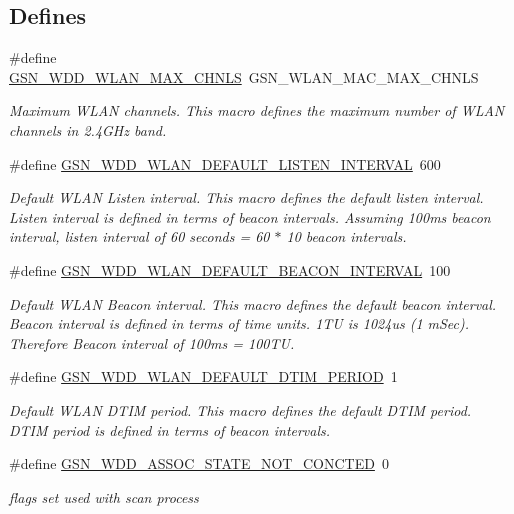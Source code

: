 \subsection*{Defines}
\begin{DoxyCompactItemize}
\item 
\#define \hyperlink{a00677_ga3d65e35c6d96f765b7e4c83373d90c57}{GSN\_\-WDD\_\-WLAN\_\-MAX\_\-CHNLS}~GSN\_\-WLAN\_\-MAC\_\-MAX\_\-CHNLS
\begin{DoxyCompactList}\small\item\em Maximum WLAN channels. This macro defines the maximum number of WLAN channels in 2.4GHz band. \end{DoxyCompactList}\item 
\#define \hyperlink{a00677_ga1cd4e2c2ef057685d974d4a865e5f934}{GSN\_\-WDD\_\-WLAN\_\-DEFAULT\_\-LISTEN\_\-INTERVAL}~600
\begin{DoxyCompactList}\small\item\em Default WLAN Listen interval. This macro defines the default listen interval. Listen interval is defined in terms of beacon intervals. Assuming 100ms beacon interval, listen interval of 60 seconds = 60 $\ast$ 10 beacon intervals. \end{DoxyCompactList}\item 
\#define \hyperlink{a00677_gab70cb03c6369e528aaa34311acfc1726}{GSN\_\-WDD\_\-WLAN\_\-DEFAULT\_\-BEACON\_\-INTERVAL}~100
\begin{DoxyCompactList}\small\item\em Default WLAN Beacon interval. This macro defines the default beacon interval. Beacon interval is defined in terms of time units. 1TU is 1024us (1 mSec). Therefore Beacon interval of 100ms = 100TU. \end{DoxyCompactList}\item 
\#define \hyperlink{a00677_ga406fd2f9962a7ec83167cd6bcafdd221}{GSN\_\-WDD\_\-WLAN\_\-DEFAULT\_\-DTIM\_\-PERIOD}~1
\begin{DoxyCompactList}\small\item\em Default WLAN DTIM period. This macro defines the default DTIM period. DTIM period is defined in terms of beacon intervals. \end{DoxyCompactList}\item 
\#define \hyperlink{a00677_ga5f07a309e776550d66ddc892d44295ae}{GSN\_\-WDD\_\-ASSOC\_\-STATE\_\-NOT\_\-CONCTED}~0
\begin{DoxyCompactList}\small\item\em flags set used with scan process \end{DoxyCompactList}\end{DoxyCompactItemize}
